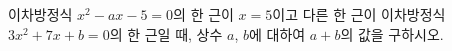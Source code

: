 이차방정식 $x^2-ax-5=0$의 한 근이 $x=5$이고 다른 한 근이 이차방정식 $3x^2+7x+b=0$의 한 근일 때, 상수 $a$, $b$에 대하여 $a+b$의 값을 구하시오.
